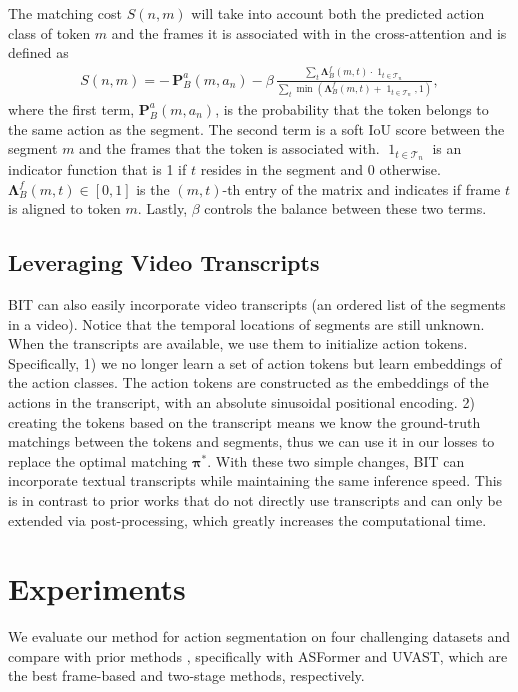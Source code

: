 \documentclass[10pt,twocolumn,letterpaper]{article}
\newcommand{\Prob}{\mathbf{P}}
\newcommand{\LM}{\mathbf{\Lambda}}
\newcommand{\mT}{\mathcal{T}}
\newcommand{\0}{\boldsymbol{0}}
\newcommand{\bpi}{\boldsymbol{\pi}}
\begin{document}
The matching cost $S(n, m)$ will take into account both the predicted action class of token $m$ and the frames it is associated with in the cross-attention and is defined as
\begin{align}
    S(n, m) =  - \, \Prob^a_B(m, a_n) 
    - \beta \, 
        \frac{\sum_{t} \LM^f_B(m, t) \cdot \operatorname{1}_{t \in \mT_n}}
    {\sum_{t} \min(\LM^f_B(m, t) + \operatorname{1}_{t \in \mT_n}, 1)},
    \label{eq:similarity}
\end{align}
where the first term, $\Prob^a_B(m, a_n)$, is the probability that the token belongs to the same action as the segment. 
The second term is a soft IoU score between the segment $m$ and the frames that the token is associated with.
$\operatorname{1}_{t \in \mT_n}$ is an indicator function that is 1 if $t$ resides in the segment and 0 otherwise. 
$\LM^f_B(m, t) \in [0, 1]$ is the $(m, t)$-th entry of the matrix and indicates if frame $t$ is aligned to token $m$. 
Lastly, $\beta$ controls the balance between these two terms.


 \subsection{Leveraging Video Transcripts}
\label{sec:action-seg-w-transcript}
BIT can also easily incorporate video transcripts (an ordered list of the segments in a video). Notice that the temporal locations of segments are still unknown. 
When the transcripts are available, we use them to initialize action tokens. 
Specifically, 1) we no longer learn a set of action tokens but learn embeddings of the action classes. The action tokens are constructed as the embeddings of the actions in the transcript, with an absolute sinusoidal positional encoding.  
2) creating the tokens based on the transcript means we know the ground-truth matchings between the tokens and segments, 
thus we can use it in our losses to replace the optimal matching $\bpi^*$. 
With these two simple changes, BIT can incorporate textual transcripts while maintaining the same inference speed. This is in contrast to prior works \cite{Farha:CVPR19,Li:TPAMI20,Yi:BMVC21,Dipika:Arxiv21,Ahn:ICCV21} that do not directly use transcripts and can only be extended via post-processing, which greatly increases the computational time.


\section{Experiments}
We evaluate our method for action segmentation on four challenging datasets and compare with prior methods \cite{Farha:CVPR19,Li:TPAMI20,Ishikawa:WACV21,Yi:BMVC21,Behrmann:ECCV22}, specifically with ASFormer\cite{Yi:BMVC21} and UVAST\cite{Behrmann:ECCV22}, which are the best frame-based and two-stage methods, respectively.
\end{document}
